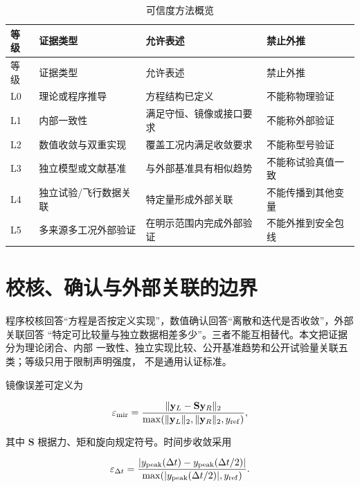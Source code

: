\documentclass[UTF8,12pt,oneside,openany,fontset=windows]{ctexbook}
\begin{document}
\begin{center}
\scriptsize
\setlength{\tabcolsep}{1pt}
\begin{longtable}{>{\raggedright\arraybackslash}p{}>{\raggedright\arraybackslash}p{}>{\raggedright\arraybackslash}p{}>{\raggedright\arraybackslash}p{}}
\caption{可信度方法概览}\\
\toprule
等级 & 证据类型 & 允许表述 & 禁止外推 \\
\midrule\endfirsthead
\toprule
等级 & 证据类型 & 允许表述 & 禁止外推 \\
\midrule\endhead
L0 & 理论或程序推导 & 方程结构已定义 & 不能称物理验证 \\
L1 & 内部一致性 & 满足守恒、镜像或接口要求 & 不能称外部验证 \\
L2 & 数值收敛与双重实现 & 覆盖工况内满足收敛要求 & 不能称型号验证 \\
L3 & 独立模型或文献基准 & 与外部基准具有相似趋势 & 不能称试验真值一致 \\
L4 & 独立试验/飞行数据关联 & 特定量形成外部关联 & 不能传播到其他变量 \\
L5 & 多来源多工况外部验证 & 在明示范围内完成外部验证 & 不能外推到安全包线 \\
\bottomrule
\end{longtable}
\end{center}

\section{校核、确认与外部关联的边界}

程序校核回答“方程是否按定义实现”，数值确认回答“离散和迭代是否收敛”，外部关联回答 “特定可比较量与独立数据相差多少”。三者不能互相替代。本文把证据分为理论闭合、内部 一致性、独立实现比较、公开基准趋势和公开试验量关联五类；等级只用于限制声明强度， 不是通用认证标准。

镜像误差可定义为

\begin{equation}
\varepsilon_{\rm mir}=
\frac{\|\mathbf y_L-\mathbf S\mathbf y_R\|_2}
{\max(\|\mathbf y_L\|_2,\|\mathbf y_R\|_2,y_{\rm ref})},
\end{equation}

其中 \(\mathbf S\) 根据力、矩和旋向规定符号。时间步收敛采用

\begin{equation}
\varepsilon_{\Delta t}=
\frac{|y_{\rm peak}(\Delta t)-y_{\rm peak}(\Delta t/2)|}
{\max(|y_{\rm peak}(\Delta t/2)|,y_{\rm ref})}.
\end{equation}
\end{document}
